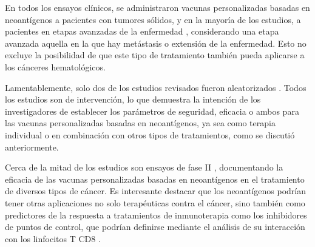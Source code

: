En todos los ensayos clínicos, se administraron vacunas personalizadas basadas en neoantígenos a pacientes con tumores sólidos, y en la mayoría de los estudios, a pacientes en etapas avanzadas de la enfermedad \citep{cheng2021bertmhc,cafri2020mrna,awad2022personalized,ott2020phase,palmer2022individualized,yu2023preliminary,holm2022neoantigen,mueller2022mass,ellingsen2022characterization,shou2022combination,aggarwal2019immunotherapy,poran2020combined,dillman2018randomized}, considerando una etapa avanzada aquella en la que hay metástasis o extensión de la enfermedad. Esto no excluye la posibilidad de que este tipo de tratamiento también pueda aplicarse a los cánceres hematológicos.


Lamentablemente, solo dos de los estudios revisados fueron aleatorizados \citep{rocconi2022proof,dillman2018randomized}. Todos los estudios son de intervención, lo que demuestra la intención de los investigadores de establecer los parámetros de seguridad, eficacia o ambos para las vacunas personalizadas basadas en neoantígenos, ya sea como terapia individual o en combinación con otros tipos de tratamientos, como se discutió anteriormente.

Cerca de la mitad de los estudios son ensayos de fase II \citep{cheng2021bertmhc, cafri2020mrna, cai2021personalized, yu2023preliminary, holm2022neoantigen, mueller2022mass, ellingsen2022characterization, aggarwal2019immunotherapy, kloor2020frameshift, podaza2020evaluation, sater2020neoadjuvant, dillman2018randomized}, documentando la eficacia de las vacunas personalizadas basadas en neoantígenos en el tratamiento de diversos tipos de cáncer. Es interesante destacar que los neoantígenos podrían tener otras aplicaciones no solo terapéuticas contra el cáncer, sino también como predictores de la respuesta a tratamientos de inmunoterapia como los inhibidores de puntos de control, que podrían definirse mediante el análisis de su interacción con los linfocitos T CD8 \citep{holm2022neoantigen}.


